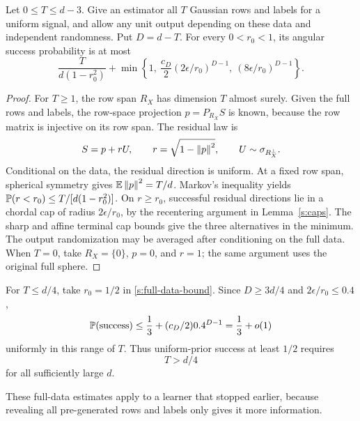 \begin{lemma}\label{s:full-data}
Let \(0\le T\le d-3\). Give an estimator all \(T\) Gaussian rows and
labels for a uniform signal, and allow any unit output depending on
these data and independent randomness. Put \(D=d-T\). For every
\(0<r_0<1\), its angular success probability is at most
\begin{equation}\label{s:full-data-bound}
 \frac{T}{d(1-r_0^2)}
 +\min\left\{1,\ \frac{c_D}{2}(2\epsilon/r_0)^{D-1},\
                    (8\epsilon/r_0)^{D-1}\right\}.
\end{equation}
\end{lemma}
\begin{proof}
For \(T\ge1\), the row span \(R_X\) has dimension \(T\) almost surely.
Given the full rows and labels, the row-space projection \(p=P_{R_X}S\)
is known, because the row matrix is injective on its row span.
The residual law is
\[
 S=p+rU,\qquad r=\sqrt{1-\left\lVert p\right\rVert^2},\qquad
 U\sim\sigma_{R_X^\perp}.
\]
Conditional on the data, the residual direction is uniform.
At a fixed row span, spherical symmetry gives
\(\mathbb E\left\lVert p\right\rVert^2=T/d\). Markov's inequality yields
\(\mathbb P(r<r_0)\le T/[d(1-r_0^2)]\).
On \(r\ge r_0\), successful residual directions lie in a chordal
cap of radius \(2\epsilon/r_0\), by the recentering argument in
Lemma~\ref{s:caps}. The sharp and affine terminal cap bounds give the
three alternatives in the minimum. The output randomization may be
averaged after conditioning on the full data. When \(T=0\), take
\(R_X=\{0\}\), \(p=0\), and \(r=1\); the same argument uses the
original full sphere.
\end{proof}

For \(T\le d/4\), take \(r_0=1/2\) in
\eqref{s:full-data-bound}. Since \(D\ge3d/4\) and
\(2\epsilon/r_0\le0.4\),
\[
 \mathbb P(\mathrm{success})
 \le\frac13+(c_D/2)0.4^{D-1}=\frac13+o(1)
\]
uniformly in this range of \(T\). Thus uniform-prior success at least
\(1/2\) requires
\begin{equation}\label{s:quarter-endpoint}
 T>d/4
\end{equation}
for all sufficiently large \(d\).



These full-data estimates apply to a learner that stopped earlier,
because revealing all pre-generated rows and labels only gives it
more information.

